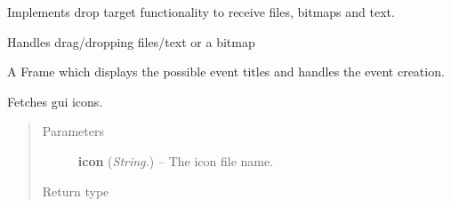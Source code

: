 \documentclass[letterpaper,10pt,english]{sphinxmanual}
\begin{document}

\begin{fulllineitems}
\label{api:wos.DropTarget}
Implements drop target functionality to receive files, bitmaps and text.

\begin{fulllineitems}
\label{api:wos.DropTarget.OnData}
Handles drag/dropping files/text or a bitmap

\end{fulllineitems}


\end{fulllineitems}


\begin{fulllineitems}
\label{api:wos.EventList}
A Frame which displays the possible event titles and
handles the event creation.

\begin{fulllineitems}
\label{api:wos.EventList.GetIcon}
Fetches gui icons.
\begin{quote}\begin{description}
\item[{Parameters}] \leavevmode
\textbf{icon} (\emph{String.}) -- The icon file name.

\item[{Return type}] \leavevmode
{}

\end{description}\end{quote}

\end{fulllineitems}


\end{fulllineitems}

\end{document}
